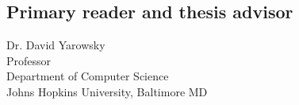 \begin{singlespace}

    \section*{Primary reader and thesis advisor}
    
    Dr. David Yarowsky \\
    Professor\\
    Department of Computer Science\\
    Johns Hopkins University, Baltimore MD 

    
    
     



\end{singlespace}